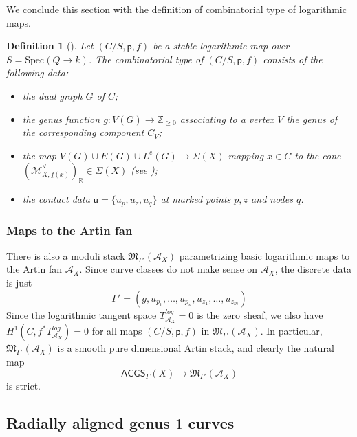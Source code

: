 \documentclass{article}
\def\oM{\overline{\mathcal{M}}}
\def\Z{\mathbb{Z}}
\def\R{\mathbb{R}}
\newtheorem{definition}{Definition}[section]
\begin{document}
We conclude this section with the definition of combinatorial type of logarithmic maps. 


\begin{definition}[{\cite[Definition 2.13]{ACGSI}}]
    Let $(C/S,\mathsf{p},f)$ be a stable logarithmic map over $S=\mathrm{Spec}(Q \to k)$. The combinatorial type of $(C/S,\mathsf{p},f)$ consists of the following data:
    \begin{itemize}
        \item the dual graph $G$ of $C$;
        \item the genus function $g: V(G) \to \Z_{\geq 0}$ associating to a vertex $V$ the genus of the corresponding component $C_V$;
        \item the map $ V(G) \cup E(G) \cup L^e(G) \to \Sigma(X)$ mapping $x \in C$ to the cone $(\oM_{X,\underline{f}(x)}^\vee)_{\R} \in \Sigma(X)$ (see \cite[Definition 2.13 and Proposition 2.25]{ACGSI});
        \item the contact data $\mathsf{u}=\{u_{p}, u_{z}, u_q\}$ at marked points $p, z$ and nodes $q$.
    \end{itemize}
\end{definition}



\subsubsection{Maps to the Artin fan}

There is also a moduli stack  $\mathfrak{M}_{\Gamma'}(\mathcal{A}_X)$ parametrizing basic logarithmic maps to the Artin fan $\mathcal{A}_X$. Since curve classes do not make sense on $\mathcal{A}_X$, the discrete data is just
$$
\Gamma'=(g,u_{p_1},\ldots,u_{p_n}, u_{z_1}, \ldots, u_{z_m})
$$
Since the logarithmic tangent space $T_{\mathcal{A}_X}^{log}= 0$ is the zero sheaf, we also have $H^1(C, f^*T_{\mathcal{A}_X}^{log})=0$ for all maps $(C/S, \mathsf{p},f)$ in $\mathfrak{M}_{\Gamma'}(\mathcal{A}_X)$. In particular, $\mathfrak{M}_{\Gamma'}(\mathcal{A}_X)$ is a smooth pure dimensional Artin stack, and clearly the natural map
$$
\mathsf{ACGS}_{\Gamma}(X) \to \mathfrak{M}_{\Gamma'}(\mathcal{A}_X)
$$
is strict.


 




 
\subsection{Radially aligned genus $1$ curves}\label{sec: aligned curves}
\end{document}
